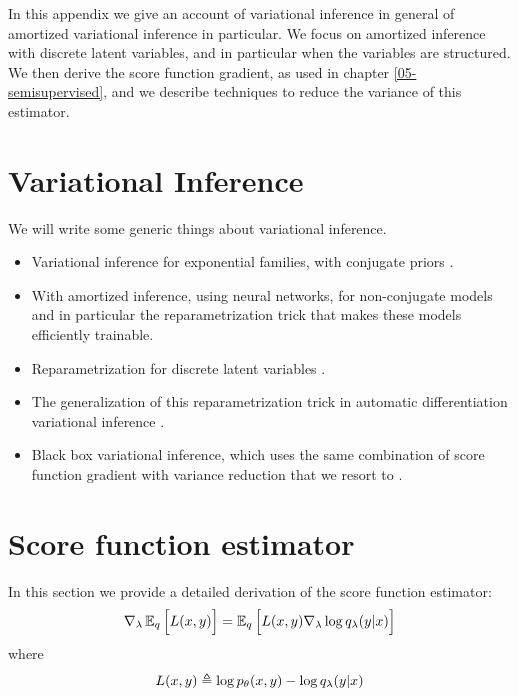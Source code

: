 

In this appendix we give an account of variational inference in general of amortized variational inference in particular. We focus on amortized inference with discrete latent variables, and in particular when the variables are structured. We then derive the score function gradient, as used in chapter \ref{05-semisupervised}, and we describe techniques to reduce the variance of this estimator.


\section{Variational Inference}
We will write some generic things about variational inference.
\begin{itemize}
  \item Variational inference for exponential families, with conjugate priors \citep{Jordan+1999:VI,Jordan+2008:GM,Blei+2016:VI}.
  \item With amortized inference, using neural networks, for non-conjugate models \citep{Kingma+2014:VAE,Rezende+14:DGM} and in particular the reparametrization trick that makes these models efficiently trainable.
  \item Reparametrization for discrete latent variables \citep{maddison2017concrete,jang2017gumbel}.
  \item The generalization of this reparametrization trick in automatic differentiation variational inference \citep{kucukelbir2017automatic}.
  \item Black box variational inference, which uses the same combination of score function gradient with variance reduction that we resort to \citep{Ranganath+2014:BBVI}.
\end{itemize}


\section{Score function estimator}
In this section we provide a detailed derivation of the score function estimator:
\begin{align}
  \label{eq:score-function-estimator}
  \nabla_{\lambda} \operatorname{\mathbb{E}}_{q} \Big[ L(x, y) \Big] = \operatorname{\mathbb{E}}_{q} \Big[ L(x, y) \nabla_{\lambda} \log q_{\lambda}(y | x) \Big]
\end{align}
where
\begin{equation*}
  L(x, y) \triangleq \log p_{\theta}(x, y) - \log q_{\lambda}(y | x)
\end{equation*}

